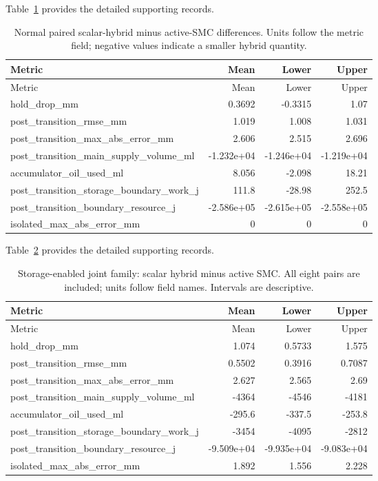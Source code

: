 \documentclass[11pt,a4paper]{article}
\begin{document}
\begingroup\hypersetup{hypertexnames=true}\small\setlength{\tabcolsep}{4pt}
Table~\ref{supp:longtable:7} provides the detailed supporting records.
\begin{longtable}{lrrr}
\caption{Normal paired scalar-hybrid minus active-SMC differences. Units follow the metric field; negative values indicate a smaller hybrid quantity.}\label{supp:longtable:7}\\\toprule
Metric & Mean & Lower & Upper\\\midrule\endfirsthead
\toprule
Metric & Mean & Lower & Upper\\\midrule\endhead
hold\_drop\_mm & 0.3692 & -0.3315 & 1.07\\
post\_transition\_rmse\_mm & 1.019 & 1.008 & 1.031\\
post\_transition\_max\_abs\_error\_mm & 2.606 & 2.515 & 2.696\\
post\_transition\_main\_supply\_volume\_ml & -1.232e+04 & -1.246e+04 & -1.219e+04\\
accumulator\_oil\_used\_ml & 8.056 & -2.098 & 18.21\\
post\_transition\_storage\_boundary\_work\_j & 111.8 & -28.98 & 252.5\\
post\_transition\_boundary\_resource\_j & -2.586e+05 & -2.615e+05 & -2.558e+05\\
isolated\_max\_abs\_error\_mm & 0 & 0 & 0\\
\bottomrule\end{longtable}\endgroup

\begingroup\hypersetup{hypertexnames=true}\small\setlength{\tabcolsep}{4pt}
Table~\ref{supp:longtable:8} provides the detailed supporting records.
\begin{longtable}{lrrr}
\caption{Storage-enabled joint family: scalar hybrid minus active SMC. All eight pairs are included; units follow field names. Intervals are descriptive.}\label{supp:longtable:8}\\\toprule
Metric & Mean & Lower & Upper\\\midrule\endfirsthead
\toprule
Metric & Mean & Lower & Upper\\\midrule\endhead
hold\_drop\_mm & 1.074 & 0.5733 & 1.575\\
post\_transition\_rmse\_mm & 0.5502 & 0.3916 & 0.7087\\
post\_transition\_max\_abs\_error\_mm & 2.627 & 2.565 & 2.69\\
post\_transition\_main\_supply\_volume\_ml & -4364 & -4546 & -4181\\
accumulator\_oil\_used\_ml & -295.6 & -337.5 & -253.8\\
post\_transition\_storage\_boundary\_work\_j & -3454 & -4095 & -2812\\
post\_transition\_boundary\_resource\_j & -9.509e+04 & -9.935e+04 & -9.083e+04\\
isolated\_max\_abs\_error\_mm & 1.892 & 1.556 & 2.228\\
\bottomrule\end{longtable}\endgroup
\end{document}

